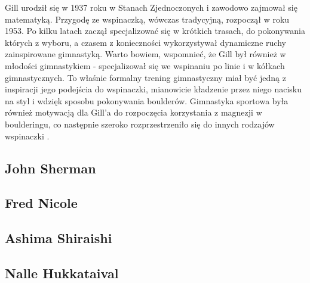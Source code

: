 \documentclass{article}
\begin{document}
Gill urodził się w 1937 roku w Stanach Zjednoczonych i zawodowo zajmował się matematyką. Przygodę ze wspinaczką, wówczas tradycyjną, rozpoczął w roku 1953. Po kilku latach zaczął specjalizować się w krótkich trasach, do pokonywania których z wyboru, a czasem z konieczności wykorzystywał dynamiczne ruchy zainspirowane gimnastyką. Warto bowiem, wspomnieć, że Gill był również w młodości gimnastykiem - specjalizował się we wspinaniu po linie i w kółkach gimnastycznych. To właśnie formalny trening gimnastyczny miał być jedną z inspiracji jego podejścia do wspinaczki, mianowicie kładzenie przez niego nacisku na styl i wdzięk sposobu pokonywania boulderów. Gimnastyka sportowa była również motywacją dla Gill'a do rozpoczęcia korzystania z magnezji w boulderingu, co następnie szeroko rozprzestrzeniło się do innych rodzajów wspinaczki \cite{gill-wiki}.

\subsection{John Sherman}


\subsection{Fred Nicole}
\subsection{Ashima Shiraishi}
\subsection{Nalle Hukkataival}
\label{nh}
\nocite{*}
\printbibliography
\end{document}
